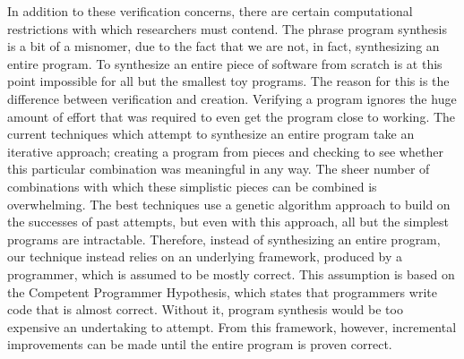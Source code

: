 \documentclass[]{article}
\begin{document}
In addition to these verification concerns, there are certain computational
restrictions with which researchers must contend.  The phrase program
synthesis is a bit of a misnomer, due to the fact that we are not, in fact,
synthesizing an entire program.  To synthesize an entire piece of software
from scratch is at this point impossible for all but the smallest toy
programs.  The reason for this is the difference between verification and
creation.  Verifying a program ignores the huge amount of effort that was
required to even get the program close to working.  The current techniques
which attempt to synthesize an entire program take an iterative approach;
creating a program from pieces and checking to see whether this particular
combination was meaningful in any way.  The sheer number of combinations
with which these simplistic pieces can be combined is overwhelming.  The
best techniques use a genetic algorithm approach to build on the successes
of past attempts, but even with this approach, all but the simplest programs
are intractable.  Therefore, instead of synthesizing an entire program, our
technique instead relies on an underlying framework, produced by a
programmer, which is assumed to be mostly correct.  This assumption is based
on the Competent Programmer Hypothesis, which states that programmers write
code that is almost correct. Without it, program synthesis
would be too expensive an undertaking to attempt.  From this framework,
however, incremental improvements can be made until the entire program is
proven correct.
\end{document}
